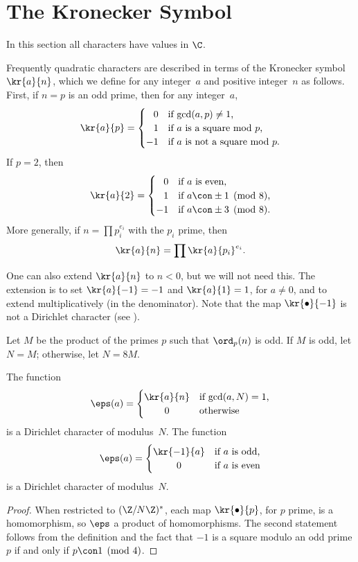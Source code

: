 \section{The Kronecker Symbol}
In this section all characters have values in $\C$.

Frequently quadratic characters are described in terms of the
Kronecker symbol $\kr{a}{n}$, which we define for any integer~$a$
and positive integer~$n$ as follows.
First, if $n=p$ is an odd prime, then for any integer~$a$,
$$
\kr{a}{p}
= \begin{cases} \hfill 0 & \text{if $\gcd(a,p)\neq 1$,}\\
  \hfill  1 & \text{if $a$ is a square mod $p$,}\\
  -1 & \text{if $a$ is not a square mod $p$.}
\end{cases}
$$
If $p=2$, then
$$
\kr{a}{2} = 
  \begin{cases} \hfill 0 & \text{if $a$ is even,}\\
  \hfill 1 & \text{if $a \con \pm 1\pmod{8}$,}\\
 -1 & \text{if $a \con \pm 3\pmod{8}$.}
\end{cases}
$$
More generally, if $n=\prod p_i^{e_i}$ with the $p_i$ prime,
then 
$$
  \kr{a}{n} = \prod \kr{a}{p_i}^{e_i}.
$$
\begin{remark}
  One can also extend $\kr{a}{n}$ to $n<0$, but we will not need this.
  The extension is to set $\kr{a}{-1} = -1$ and $\kr{a}{1} = 1$, for
  $a\neq 0$, and to extend multiplicatively (in the denominator).
  Note that the map $\kr{\bullet}{-1}$ is not a Dirichlet
character (see ).
\end{remark}

Let $M$ be the product of the primes $p$ such
that $\ord_p(n)$ is odd.
If $M$ is odd, let $N=M$; otherwise, let $N=8M$.
\begin{lemma}\label{lem:jacdir}
The function 
$$
  \eps(a) = \begin{cases}
         \kr{a}{n} & \text{if $\gcd(a,N)=1$,}\\
         \hfill 0\hfill          & \text{otherwise}
       \end{cases}
$$ 
is a Dirichlet character of modulus~$N$.
The function 
$$
  \eps(a) = \begin{cases}
     \kr{-1}{a} &\text{if $a$ is odd,}\\
    \hfill 0 \hfill & \text{if $a$ is even}
   \end{cases}
$$
is a Dirichlet character of modulus~$N$.
\end{lemma}
\begin{proof}
  When restricted to $(\Z/N\Z)^*$, each map $\kr{\bullet}{p}$, for
  $p$ prime, is a homomorphism, so $\eps$ a product of homomorphisms.
  The second statement follows from the definition and the
  fact that $-1$ is a
  square modulo an odd prime $p$ if and only if $p\con 1\pmod{4}$.
\end{proof}


